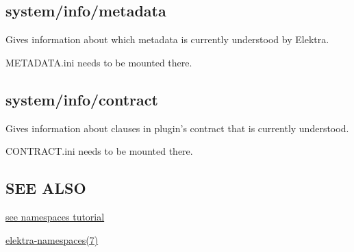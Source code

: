 \subsection*{system/info/metadata}

Gives information about which metadata is currently understood by Elektra.

{\ttfamily M\+E\+T\+A\+D\+A\+T\+A.\+ini} needs to be mounted there.

\subsection*{system/info/contract}

Gives information about clauses in plugin's contract that is currently understood.

{\ttfamily C\+O\+N\+T\+R\+A\+C\+T.\+ini} needs to be mounted there.

\subsection*{S\+E\+E A\+L\+S\+O}


\begin{DoxyItemize}
\item \hyperlink{doc_tutorials_namespaces_md}{see namespaces tutorial}
\item \hyperlink{md_doc_help_elektra-namespaces_doc_help_elektra-namespaces_md}{elektra-\/namespaces(7)} 
\end{DoxyItemize}